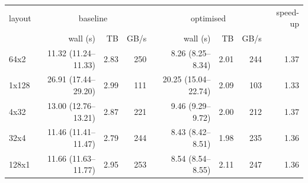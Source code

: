 \begin{tabular}{lrrrrrrr}
\toprule
layout & \multicolumn{3}{c}{baseline} & \multicolumn{3}{c}{optimised} & speed-up \\
 & wall (s) & TB & GB/s & wall (s) & TB & GB/s & \\
\midrule
64x2 & 11.32 (11.24--11.33) & 2.83 & 250 & 8.26 (8.25--8.34) & 2.01 & 244 & 1.37 \\
1x128 & 26.91 (17.44--29.20) & 2.99 & 111 & 20.25 (15.04--22.74) & 2.09 & 103 & 1.33 \\
4x32 & 13.00 (12.76--13.21) & 2.87 & 221 & 9.46 (9.29--9.72) & 2.00 & 212 & 1.37 \\
32x4 & 11.46 (11.41--11.47) & 2.79 & 244 & 8.43 (8.42--8.51) & 1.98 & 235 & 1.36 \\
128x1 & 11.66 (11.63--11.77) & 2.95 & 253 & 8.54 (8.54--8.55) & 2.11 & 247 & 1.36 \\
\bottomrule
\end{tabular}

